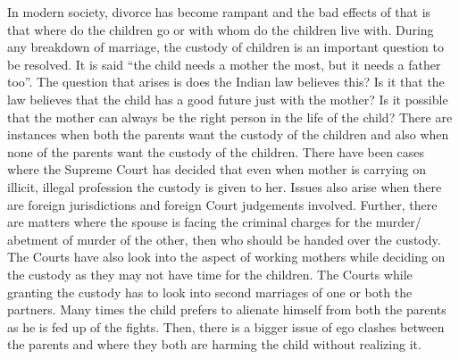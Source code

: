 \setcounter{figure}{0}
\setcounter{table}{0}
\setcounter{footnote}{0}

\label{2018-art3}

\begin{multicols}{2}


\noi
In modern society, divorce has become rampant and the bad effects of that is that where do the
children go or with whom do the children live with. During any breakdown of marriage, the
custody of children is an important question to be resolved. It is said “the child needs a mother
the most, but it needs a father too”. The question that arises is does the Indian law believes this?
Is it that the law believes that the child has a good future just with the mother? Is it possible that
the mother can always be the right person in the life of the child? There are instances when both
the parents want the custody of the children and also when none of the parents want the custody
of the children. There have been cases where the Supreme Court has decided that even when
mother is carrying on illicit, illegal profession the custody is given to her. Issues also arise when
there are foreign jurisdictions and foreign Court judgements involved. Further, there are matters
where the spouse is facing the criminal charges for the murder/ abetment of murder of the other,
then who should be handed over the custody. The Courts have also look into the aspect of working
mothers while deciding on the custody as they may not have time for the children. The Courts
while granting the custody has to look into second marriages of one or both the partners. Many
times the child prefers to alienate himself from both the parents as he is fed up of the fights. Then,
there is a bigger issue of ego clashes between the parents and where they both are harming the
child without realizing it.


\end{multicols}
